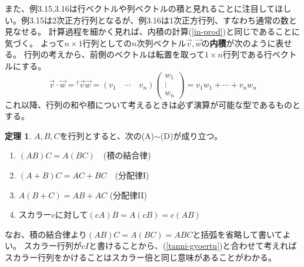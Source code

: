 \documentclass[10pt]{jsreport}
\theoremstyle{definition}%
\newtheorem{thm}{定理}[section]%
\newcommand{\kakko}[1]{\left(#1 \right)} %
\newcommand{\vc}[1]{\overrightarrow{#1}}%
\numberwithin{equation}{section}%
\begin{document}
また、例3.15,3.16は行ベクトルや列ベクトルの積と見れることに注目してほしい。例3.15は2次正方行列となるが、例3.16は1次正方行列、すなわち通常の数と見なせる。
計算過程を細かく見れば、内積の計算(\ref{in-prod})と同じであることに気づく。
よって$n\times 1$行列としての$n$次列ベクトル$\vc{v},\vc{w}$の{\bf 内積}が次のように表せる。
行列の考えから、前側のベクトルは転置を取って$1\times n$行列である行ベクトルにする。
\begin{equation}
  \vc{v}\cdot\vc{w}={}^{t}\vc{v}\vc{w}=\kakko{v_{1} \quad \cdots \quad v_{n} }
  \kakko{\begin{matrix}
    w_{1}\\
    \vdots \\
    w_{n}
  \end{matrix}
  }=v_{1}w_{1}+\cdots +v_{n}w_{n}
\end{equation}
これ以降、行列の和や積について考えるときは必ず演算が可能な型であるものとする。
\begin{screen}
  \begin{thm}
    $A,B,C$を行列とすると、次の(A)$\sim$(D)が成り立つ。
    \begin{enumerate}
      \item $(AB)C=A(BC)$　(積の結合律) 
      \item $(A+B)C=AC+BC$　(分配律I)
      \item $A(B+C)=AB+AC$ (分配律II)
      \item スカラー$c$に対して$(cA)B=A(cB)=c(AB)$
    \end{enumerate}
  \end{thm}
\end{screen}
なお、積の結合律より$(AB)C=A(BC)=ABC$と括弧を省略して書いてよい。
スカラー行列が$cI$と書けることから、(\ref{tanni-gyoertu})と合わせて考えればスカラー行列をかけることはスカラー倍と同じ意味があることがわかる。
\end{document}
